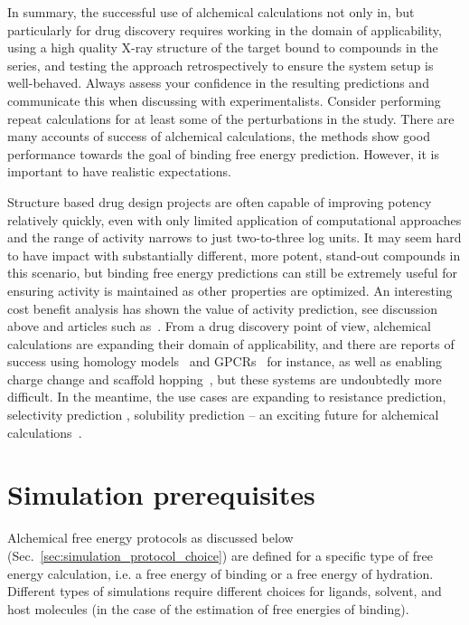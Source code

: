 \documentclass[9pt,bestpractices]{livecoms}
\begin{document}
In summary, the successful use of alchemical calculations not only in, but particularly for drug discovery requires working in the domain of applicability, using a high quality X-ray structure of the target bound to compounds in the series, and testing the approach retrospectively to ensure the system setup is well-behaved. Always assess your confidence in the resulting predictions and communicate this when discussing with experimentalists. Consider performing repeat calculations for at least some of the perturbations in the study. 
 There are many accounts of success of alchemical calculations, the methods show good performance towards the goal of binding free energy prediction. However, it is important to have realistic expectations. 

Structure based drug design projects are often capable of improving potency relatively quickly, even with only limited application of computational approaches and the range of activity narrows to just two-to-three log units. It may seem hard to have impact with substantially different, more potent, stand-out compounds in this scenario, but binding free energy predictions can still be extremely useful for ensuring activity is maintained as other properties are optimized. An interesting cost benefit analysis has shown the value of activity prediction, see discussion above and articles such as~\cite{mobley2012perspective}. 
From a drug discovery point of view, alchemical calculations are expanding their domain of applicability, and there are reports of success using homology models~\cite{cappel2016relative} and GPCRs~\cite{deflorian2020accurate,lenselink2016predicting} for instance, as well as enabling charge change and scaffold hopping~\cite{chen2018accurate, wang2017accurate}, but these systems are undoubtedly more difficult. In the meantime, the use cases are expanding to resistance prediction, selectivity prediction , solubility prediction – an exciting future for alchemical calculations~\cite{hauser2018predicting, albanese2020structure, mondal2019free}. 

%
%
\section{Simulation prerequisites}
\label{sec:prerequisites}
Alchemical free energy protocols as discussed below (Sec.~\ref{sec:simulation_protocol_choice}) are defined for a specific type of free energy calculation, i.e. a free energy of binding or a free energy of hydration. Different types of simulations require different choices for ligands, solvent, and host molecules (in the case of the estimation of free energies of binding).
\end{document}
